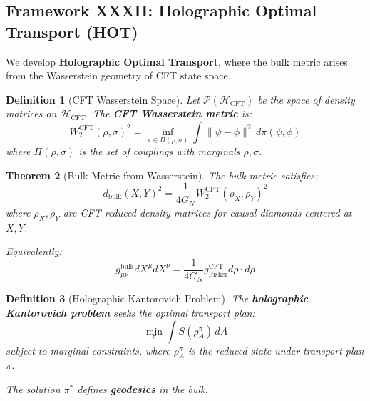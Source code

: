 \documentclass[12pt,a4paper]{article}
\newtheorem{theorem}{Theorem}[section]
\newtheorem{definition}[theorem]{Definition}
\begin{document}
\subsection{Framework XXXII: Holographic Optimal Transport (HOT)}
\label{subsec:holographic-optimal-transport}

We develop \textbf{Holographic Optimal Transport}, where the bulk metric arises from the Wasserstein geometry of CFT state space.

\begin{definition}[CFT Wasserstein Space]\label{def:cft-wasserstein}
Let $\mathcal{P}(\mathcal{H}_{\text{CFT}})$ be the space of density matrices on $\mathcal{H}_{\text{CFT}}$. The \textbf{CFT Wasserstein metric} is:
\begin{equation}
W_2^{\text{CFT}}(\rho, \sigma)^2 = \inf_{\pi \in \Pi(\rho, \sigma)} \int \|\psi - \phi\|^2 \, d\pi(\psi, \phi)
\end{equation}
where $\Pi(\rho, \sigma)$ is the set of couplings with marginals $\rho, \sigma$.
\end{definition}

\begin{theorem}[Bulk Metric from Wasserstein]\label{thm:bulk-wasserstein}
The bulk metric satisfies:
\begin{equation}
d_{\text{bulk}}(X, Y)^2 = \frac{1}{4G_N} W_2^{\text{CFT}}(\rho_X, \rho_Y)^2
\end{equation}
where $\rho_X, \rho_Y$ are CFT reduced density matrices for causal diamonds centered at $X, Y$.

Equivalently:
\begin{equation}
g_{\mu\nu}^{\text{bulk}} dX^\mu dX^\nu = \frac{1}{4G_N} g_{\text{Fisher}}^{\text{CFT}} d\rho \cdot d\rho
\end{equation}
\end{theorem}

\begin{definition}[Holographic Kantorovich Problem]\label{def:holo-kantorovich}
The \textbf{holographic Kantorovich problem} seeks the optimal transport plan:
\begin{equation}
\min_{\pi} \int S(\rho_A^\pi) \, dA
\end{equation}
subject to marginal constraints, where $\rho_A^\pi$ is the reduced state under transport plan $\pi$.

The solution $\pi^*$ defines \textbf{geodesics} in the bulk.
\end{definition}
\end{document}
